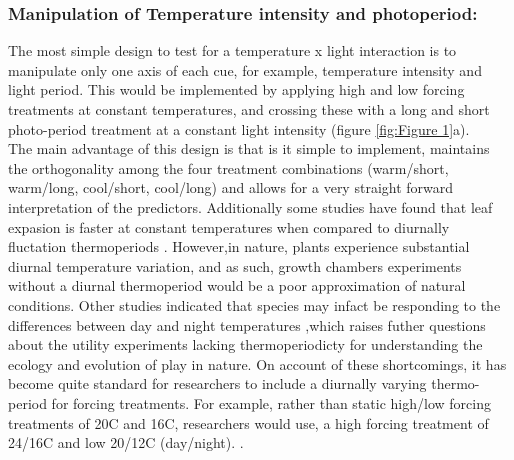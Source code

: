 \documentclass[12pt]{article}\usepackage[]{graphicx}\usepackage[]{color}
\begin{document}
\subsubsection*{Manipulation of Temperature intensity and photoperiod:}
\indent \indent The most simple design to test for a temperature x light interaction is to manipulate only one axis of each cue, for example, temperature intensity and light period. This would be implemented by applying high and low forcing treatments at constant temperatures, and crossing these with a long and short photo-period treatment at a constant light intensity (figure \ref{fig:Figure 1}a).\\
\indent The main advantage of this design is that is it simple to implement, maintains the orthogonality among the four treatment combinations (warm/short, warm/long, cool/short, cool/long) and allows for a very straight forward interpretation of the predictors. Additionally some studies have found that leaf expasion is faster at constant temperatures when compared to diurnally fluctation thermoperiods \citep{Erwin1995}. However,in nature, plants experience substantial diurnal temperature variation, and as such, growth chambers experiments without a diurnal thermoperiod would be a poor approximation of natural conditions. Other studies indicated that species may infact be responding to the differences between day and night temperatures \citep{Erwin1995},which raises futher questions about the utility experiments lacking thermoperiodicty for understanding the ecology and evolution of play in nature. On account of these shortcomings, it has become quite standard for researchers to include a diurnally varying thermo-period for forcing treatments. For example, rather than static high/low forcing treatments of 20\degree C and 16\degree C, researchers would use, a high forcing treatment of 24\degree/16\degree C and low 20\degree/12\degree C (day/night). \citep{Ettinger_inprep}.
\end{document}

